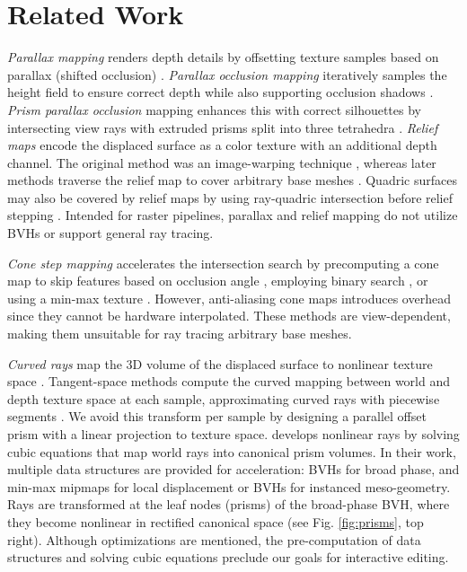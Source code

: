 \section{Related Work}
\textit{Parallax mapping} renders depth details by offsetting texture samples based on parallax (shifted occlusion) \cite{Kaneko2001}. \textit{Parallax occlusion mapping} iteratively samples the height field to ensure correct depth while also supporting occlusion shadows \cite{Tatarchuck2005}. \textit{Prism parallax occlusion} mapping enhances this with correct silhouettes by intersecting view rays with extruded prisms split into three tetrahedra \cite{Dachsbacher2007}. \textit{Relief maps} encode the displaced surface as a color texture with an additional depth channel. The original method was an image-warping technique  \cite{Oliveira2000}, whereas later methods traverse the relief map to cover arbitrary base meshes \cite{Policarpo2007}. Quadric surfaces may also be covered by relief maps by using ray-quadric intersection before relief stepping \cite{Oliveira2005}. Intended for raster pipelines, parallax and relief mapping do not utilize BVHs or support general ray tracing. 

\textit{Cone step mapping} accelerates the intersection search by precomputing a cone map to skip features based on occlusion angle  \cite{Donnelly2005}\cite{Dummer2006}, employing binary search \cite{Policarpo2007}, or using a min-max texture \cite{Lee2009}. However, anti-aliasing cone maps introduces overhead since they cannot be hardware interpolated. These methods are view-dependent, making them unsuitable for ray tracing arbitrary base meshes. 

\textit{Curved rays} map the 3D volume of the displaced surface to nonlinear texture space \cite{Kajiya1983}. Tangent-space methods compute the curved mapping between world and depth texture space at each sample, approximating curved rays with piecewise segments \cite{Chen2008}. We avoid this transform per sample by designing a parallel offset prism with a linear projection to texture space. \cite{Ogaki2023} develops nonlinear rays by solving cubic equations that map world rays into canonical prism volumes. In their work, multiple data structures are provided for acceleration: BVHs for broad phase, and min-max mipmaps for local displacement or BVHs for instanced meso-geometry. Rays are transformed at the leaf nodes (prisms) of the broad-phase BVH, where they become nonlinear in rectified canonical space (see Fig. \ref{fig:prisms}, top right). Although optimizations are mentioned, the pre-computation of data structures and solving cubic equations preclude our goals for interactive editing.

